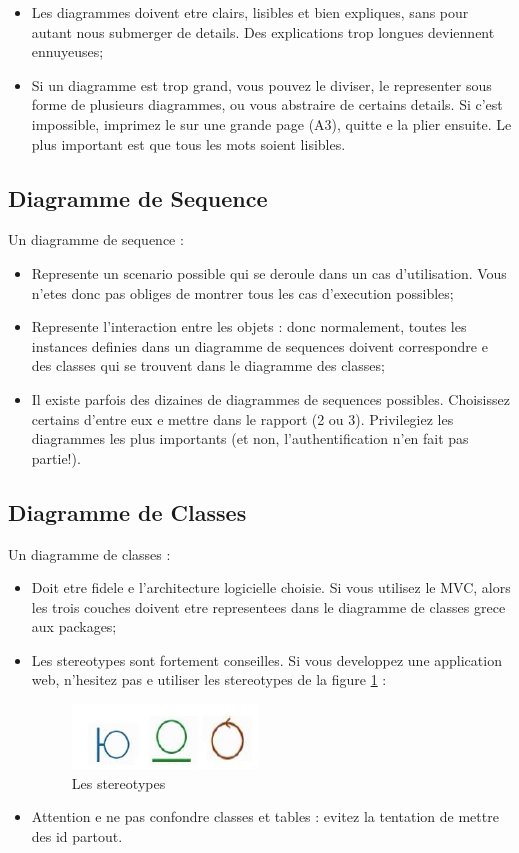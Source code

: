 \begin{spacing}{1.2}
\begin{itemize}
\item Les diagrammes doivent etre clairs, lisibles et bien expliques, sans pour autant
nous submerger de details. Des explications trop longues deviennent ennuyeuses;
\item Si un diagramme est trop grand, vous pouvez le diviser, le representer sous
forme de plusieurs diagrammes, ou vous abstraire de certains details. Si c'est
impossible, imprimez le sur une grande page (A3), quitte e la plier ensuite. Le
plus important est que tous les mots soient lisibles.

\end{itemize}
\subsection{Diagramme de Sequence}
Un diagramme de sequence :
\begin{itemize}
	\item Represente un scenario possible qui se deroule dans un cas d'utilisation.
	Vous n'etes donc pas obliges de montrer tous les cas d'execution possibles;
	\item Represente l'interaction entre les objets : donc normalement, toutes les
	instances definies dans un diagramme de sequences doivent correspondre
	 e des classes qui se trouvent dans le diagramme des classes;
	 \item Il existe parfois des dizaines de diagrammes de sequences possibles. Choisissez certains d'entre eux e mettre dans le rapport (2 ou 3). Privilegiez les diagrammes les plus importants (et non, l'authentification n'en fait pas partie!).
\end{itemize}
\subsection{Diagramme de Classes}
Un diagramme de classes :
\begin{itemize}
\item Doit etre fidele e l'architecture logicielle choisie. Si vous utilisez le MVC,
alors les trois couches doivent etre representees dans le diagramme de classes grece aux packages;
\item Les stereotypes sont fortement conseilles. Si vous developpez une
application web, n'hesitez pas e utiliser les stereotypes de la figure \ref{fig:fig2} :
\begin{figure}[!ht]\centering
\includegraphics[scale=0.9]{stereotypes.jpg}
\caption{Les stereotypes}
\label{fig:fig2}
\end{figure}
\item Attention e ne pas confondre classes et tables : evitez la tentation de
mettre des id partout.


\end{itemize}
\end{spacing}
